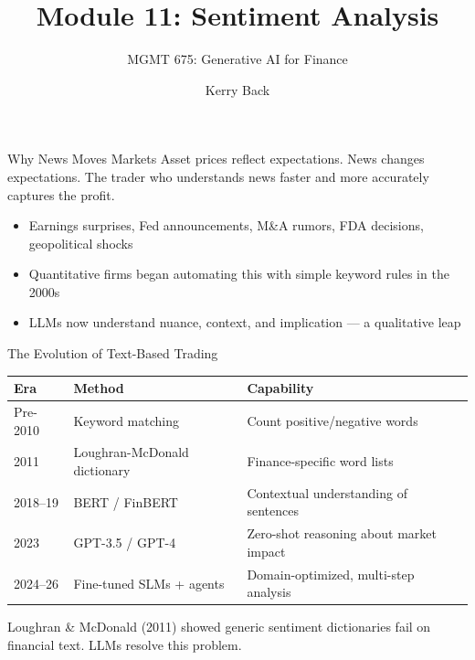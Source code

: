\documentclass[aspectratio=169]{beamer}
\subtitle{MGMT 675: Generative AI for Finance}
\title{Module 11: Sentiment Analysis}
\author{Kerry Back}
\date{}
\begin{document}
\maketitle


\begin{frame}{Why News Moves Markets}
Asset prices reflect expectations. News changes expectations. The trader who \alert{understands news faster and more accurately} captures the profit.
\vspace{0.3cm}
\begin{itemize}
  \item Earnings surprises, Fed announcements, M\&A rumors, FDA decisions, geopolitical shocks
  \item Quantitative firms began automating this with simple keyword rules in the 2000s
  \item \alert{LLMs now understand nuance, context, and implication} --- a qualitative leap
\end{itemize}
\end{frame}

\begin{frame}{The Evolution of Text-Based Trading}
\begin{center}
\small
\begin{tabular}{@{} l l l @{}}
\toprule
\textbf{Era} & \textbf{Method} & \textbf{Capability} \\
\midrule
Pre-2010 & Keyword matching & Count positive/negative words \\
2011 & Loughran-McDonald dictionary & Finance-specific word lists \\
2018--19 & BERT / FinBERT & Contextual understanding of sentences \\
2023 & GPT-3.5 / GPT-4 & Zero-shot reasoning about market impact \\
2024--26 & Fine-tuned SLMs + agents & Domain-optimized, multi-step analysis \\
\bottomrule
\end{tabular}
\end{center}
\vspace{0.3cm}
Loughran \& McDonald (2011) showed generic sentiment dictionaries fail on financial text. LLMs resolve this problem.
\end{frame}

\end{document}
